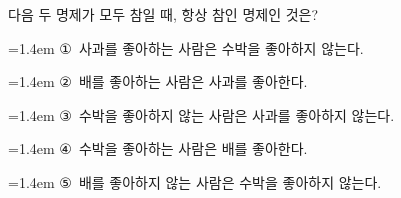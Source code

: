 다음 두 명제가 모두 참일 때, 항상 참인 명제인 것은?
\par\medskip\par\noindent\hangindent=1.4em {\small ①}\ 사과를 좋아하는 사람은 수박을 좋아하지 않는다.\par\noindent\hangindent=1.4em {\small ②}\ 배를 좋아하는 사람은 사과를 좋아한다.\par\noindent\hangindent=1.4em {\small ③}\ 수박을 좋아하지 않는 사람은 사과를 좋아하지 않는다.\par\noindent\hangindent=1.4em {\small ④}\ 수박을 좋아하는 사람은 배를 좋아한다.\par\noindent\hangindent=1.4em {\small ⑤}\ 배를 좋아하지 않는 사람은 수박을 좋아하지 않는다.\par\medskip
